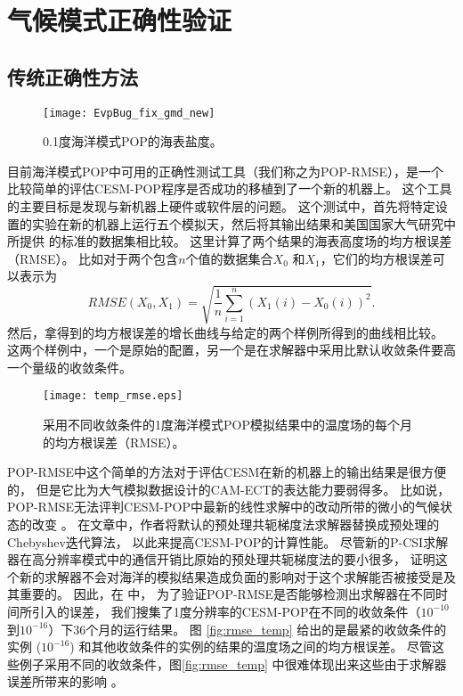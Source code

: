 \section{气候模式正确性验证}
\label{verify:verification} 

\subsection{传统正确性方法}
\label{verify:premethod}
\begin{figure}%
\centering
\texttt{[image: EvpBug\_fix\_gmd\_new]}
\caption[] {0.1度海洋模式POP的海表盐度。 \label{fig:sst}}
\end{figure}

目前海洋模式POP中可用的正确性测试工具（我们称之为POP-RMSE），是一个比较简单的评估CESM-POP程序是否成功的移植到了一个新的机器上。 
这个工具的主要目标是发现与新机器上硬件或软件层的问题。 
这个测试中，首先将特定设置的实验在新的机器上运行五个模拟天，然后将其输出结果和美国国家大气研究中所提供 的标准的数据集相比较。
这里计算了两个结果的海表高度场的均方根误差（RMSE）。 比如对于两个包含$n$个值的数据集合$X_0$ 和$X_1$，它们的均方根误差可以表示为
 \begin{equation*}
 RMSE(X_0, X_1) = \sqrt{\frac{1}{n}\sum_{i=1}^n(X_1(i)-X_0(i))^2}.
 \end{equation*}
然后，拿得到的均方根误差的增长曲线与给定的两个样例所得到的曲线相比较。 
这两个样例中，一个是原始的配置，另一个是在求解器中采用比默认收敛条件要高一个量级的收敛条件。 


\begin{figure}%
\begin{center}
\texttt{[image: temp\_rmse.eps]}
\end{center}
\caption[] {采用不同收敛条件的1度海洋模式POP模拟结果中的温度场的每个月的均方根误差（RMSE）。}
\label{fig:ssh_rmse_t}
\end{figure}

POP-RMSE中这个简单的方法对于评估CESM在新的机器上的输出结果是很方便的， 但是它比为大气模拟数据设计的CAM-ECT的表达能力要弱得多。 
比如说，POP-RMSE无法评判CESM-POP中最新的线性求解中的改动所带的微小的气候状态的改变 \cite{yong2015}。 
在文章\cite{yong2015}中，作者将默认的预处理共轭梯度法求解器替换成预处理的Chebyshev迭代算法， 以此来提高CESM-POP的计算性能。
尽管新的P-CSI求解器在高分辨率模式中的通信开销比原始的预处理共轭梯度法的要小很多， 证明这个新的求解器不会对海洋的模拟结果造成负面的影响对于这个求解能否被接受是及其重要的。 
因此，在 \cite{yong2015}中， 为了验证POP-RMSE是否能够检测出求解器在不同时间所引入的误差， 我们搜集了1度分辨率的CESM-POP在不同的收敛条件（$10^{-10}$ 到$10^{-16}$）下36个月的运行结果。  图   \ref{fig:rmse_temp} 给出的是最紧的收敛条件的实例  ($10^{-16}$) 和其他收敛条件的实例的结果的温度场之间的均方根误差。 
尽管这些例子采用不同的收敛条件，图\ref{fig:rmse_temp} 中很难体现出来这些由于求解器误差所带来的影响  \cite{yong2015}。 

